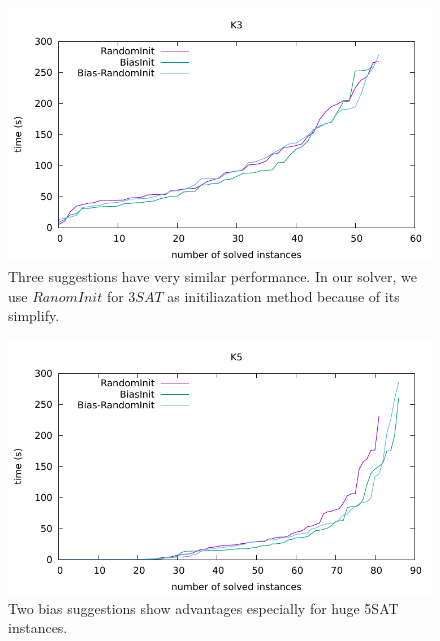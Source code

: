 \documentclass[12pt,a4paper,twoside]{scrartcl}
\numberwithin{equation}{section}
\begin{document}
\begin{figure}[H]
\begin{center}
  \includegraphics[scale = 1]{DATA/K3/e1.pdf}
  \end{center}
  \caption{Three suggestions have very similar performance. In our solver, we use $RanomInit$ for $3SAT$ as initiliazation method because of its simplify.}
  \label{Experiment 1 k3 cactus plot}
  \end{figure}
  \begin{figure}[H]
\begin{center}
  \includegraphics[scale = 1]{DATA/K5/e1.pdf}
  \end{center}
  \caption{Two bias suggestions show advantages especially for huge 5SAT instances.}
  \label{Experiment 1 k5 cactus plot}
  \end{figure}
\end{document}
